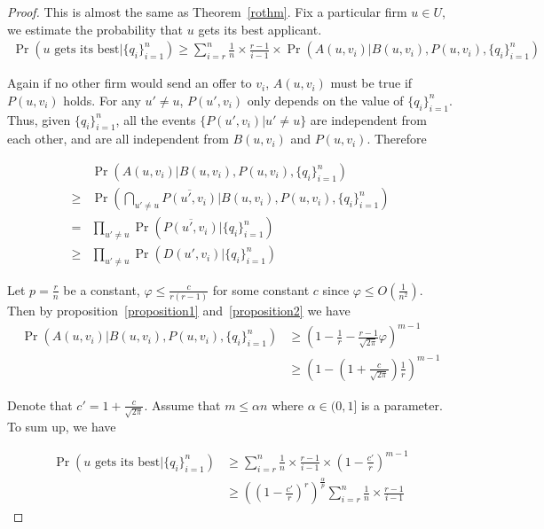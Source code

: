 \begin{proof}
This is almost the same as Theorem~\ref{rothm}.
Fix a particular firm $u \in U$, we estimate the probability that $u$ gets
its best applicant.
\begin{align*}
    \Pr(u\text{ gets its best}|\{q_i\}_{i=1}^n) \ge \sum_{i=r}^{n} \frac{1}{n} \times \frac{r-1}{i-1}
                 \times \Pr(A(u, v_i) | B(u, v_i), P(u, v_i), \{q_i\}_{i=1}^n)
\end{align*}

Again if no other firm would send an offer to $v_i$, $A(u, v_i)$ must be true if $P(u, v_i)$ holds.
For any $u' \neq u$, $P(u', v_i)$ only depends on the value of $\{q_i\}_{i=1}^n$.
Thus, given $\{q_i\}_{i=1}^n$, all the events $\{P(u', v_i) | u' \neq u\}$ are independent from each other,
and are all independent from $B(u, v_i)$ and $P(u, v_i)$.
Therefore

\begin{align*}
    & \Pr(A(u, v_i) | B(u, v_i), P(u, v_i), \{q_i\}_{i=1}^n) \\
    \ge & \Pr(\bigcap_{u' \neq u}\overline{P(u', v_i)} | B(u, v_i), P(u, v_i), \{q_i\}_{i=1}^n) \\
    = & \prod_{u' \neq u} \Pr(\overline{P(u', v_i)} | \{q_i\}_{i=1}^n) \\
    \ge & \prod_{u' \neq u} \Pr(D(u', v_i) | \{q_i\}_{i=1}^n)
\end{align*}

Let $p = \frac{r}{n}$ be a constant, $\varphi \le \frac{c}{r(r-1)}$ for
some constant $c$ since $\varphi \le O(\frac{1}{n^2})$.
Then by proposition~\ref{proposition1} and~\ref{proposition2}
we have
\begin{align*}
\Pr(A(u, v_i) | B(u, v_i), P(u, v_i), \{q_i\}_{i=1}^n)
&\ge (1 - \frac{1}{r} - \frac{r - 1}{\sqrt{2\pi}}\varphi)^{m-1} \\
& \ge (1 - (1+\frac{c}{\sqrt{2\pi}})\frac{1}{r})^{m-1}
\end{align*}

Denote that $c' = 1 + \frac{c}{\sqrt{2\pi}}$.
Assume that $m \le \alpha n$ where $\alpha \in (0, 1]$ is a parameter.
To sum up, we have

\begin{align*}
    \Pr(u\text{ gets its best} | \{q_i\}_{i=1}^n)
    &\ge \sum_{i=r}^{n} \frac{1}{n} \times \frac{r-1}{i-1} \times (1 - \frac{c'}{r})^{m-1} \\
    &\ge ((1 - \frac{c'}{r})^{r})^{\frac{\alpha}{p}} \sum_{i=r}^{n} \frac{1}{n} \times \frac{r-1}{i-1}
\end{align*}


\end{proof}
